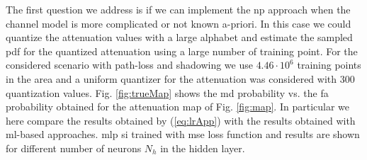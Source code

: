 \documentclass[draftcls,onecolumn,12pt]{IEEEtran}
\begin{document}

The first question we address is if we can implement the \ac{np} approach when the channel model is more complicated or not known a-priori. In this case we could quantize the attenuation values with a large alphabet and estimate the sampled \ac{pdf} for the quantized attenuation using a large number of training point. For the considered scenario with path-loss and shadowing we use $4.46 \cdot 10^6$ training points in the area and a uniform quantizer for the attenuation was considered with $300$ quantization values. Fig. \ref{fig:trueMap} shows the \ac{md} probability vs. the \ac{fa} probability obtained for the attenuation map of Fig. \ref{fig:map}. In particular we here compare the results obtained by (\ref{eq:lrApp}) with the results obtained with \ac{ml}-based approaches. \Ac{mlp} si trained with \ac{mse} loss function and results are shown for different number of neurons $N_h$ in the hidden layer.
\end{document}
